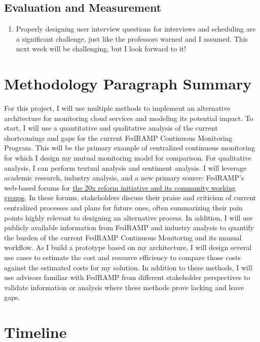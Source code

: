 \documentclass{jdf}
\begin{document}
\subsection*{Evaluation and Measurement}

\begin{enumerate}
    \item Properly designing user interview questions for interviews and scheduling are a significant challenge, just like the professors warned and I assumed. This next week will be challenging, but I look forward to it!
\end{enumerate}

\section*{Methodology Paragraph Summary}

For this project, I will use multiple methods to implement an alternative architecture for monitoring cloud services and modeling its potential impact. To start, I will use a quantitative and qualitative analysis of the current shortcomings and gaps for the current FedRAMP Continuous Monitoring Program. This will be the primary example of centralized continuous monitoring for which I design my mutual monitoring model for comparison. For qualitative analysis, I can perform textual analysis and sentiment analysis. I will leverage academic research, industry analysis, and a new primary source: FedRAMP's web-based forums for \hyperlink{https://www.fedramp.gov/20x/working-groups/}{the 20x reform initiative and its community working groups}. In these forums, stakeholders discuss their praise and criticism of current centralized processes and plans for future ones, often summarizing their pain points highly relevant to designing an alternative process. In addition, I will use publicly available information from FedRAMP and industry analysis to quantify the burden of the current FedRAMP Continuous Monitoring and its manual workflow. As I build a prototype based on my architecture, I will design several use cases to estimate the cost and resource efficiency to compare those costs against the estimated costs for my solution. In addition to these methods, I will use advisors familiar with FedRAMP from different stakeholder perspectives to validate information or analysis where these methods prove lacking and leave gaps.

\section*{Timeline}
\end{document}
